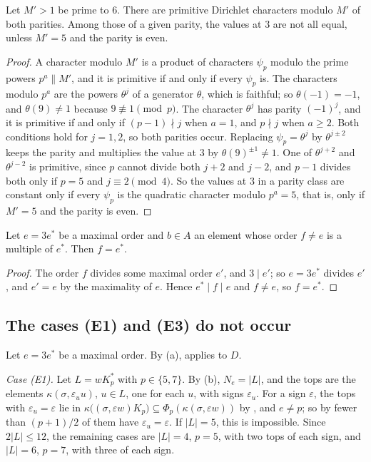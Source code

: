 \begin{lemma}\label{lem:chars}
Let $M'>1$ be prime to $6$. There are primitive Dirichlet characters modulo
$M'$ of both parities. Among those of a given parity, the values at $3$ are
not all equal, unless $M'=5$ and the parity is even.
\end{lemma}

\begin{proof}
A character modulo $M'$ is a product of characters $\psi_{p}$ modulo the
prime powers $p^{a}\parallel M'$, and it is primitive if and only if every
$\psi_{p}$ is. The characters modulo $p^{a}$ are the powers $\theta^{j}$ of a
generator $\theta$, which is faithful; so $\theta(-1)=-1$, and
$\theta(9)\ne1$ because $9\not\equiv1\pmod p$. The character $\theta^{j}$
has parity $(-1)^{j}$, and it is primitive if and only if $(p-1)\nmid j$ when
$a=1$, and $p\nmid j$ when $a\ge2$. Both conditions hold for $j=1,2$, so
both parities occur. Replacing $\psi_{p}=\theta^{j}$ by $\theta^{j\pm2}$
keeps the parity and multiplies the value at $3$ by $\theta(9)^{\pm1}\ne1$.
One of $\theta^{j+2}$ and $\theta^{j-2}$ is primitive, since $p$ cannot
divide both $j+2$ and $j-2$, and $p-1$ divides both only if $p=5$ and
$j\equiv2\pmod4$. So the values at $3$ in a parity class are constant only if
every $\psi_{p}$ is the quadratic character modulo $p^{a}=5$, that is, only
if $M'=5$ and the parity is even.
\end{proof}

\begin{lemma}\label{lem:multiple}
Let $e=3e^{*}$ be a maximal order and $b\in A$ an element whose order
$f\ne e$ is a multiple of $e^{*}$. Then $f=e^{*}$.
\end{lemma}

\begin{proof}
The order $f$ divides some maximal order $e'$, and $3\mid e'$; so $e=3e^{*}$
divides $e'$, and $e'=e$ by the maximality of $e$. Hence $e^{*}\mid f\mid e$
and $f\ne e$, so $f=e^{*}$.
\end{proof}

\subsection{The cases (E1) and (E3) do not occur}
Let $e=3e^{*}$ be a maximal order. By (a), 
applies to $D$.

\emph{Case (E1).} Let $L=wK^{*}_{p}$ with $p\in\{5,7\}$. By
(b), $N_{e}=|L|$, and the tops are the elements
$\kappa(\sigma,\varepsilon_{u}u)$, $u\in L$, one for each $u$, with signs
$\varepsilon_{u}$. For a sign $\varepsilon$, the tops with
$\varepsilon_{u}=\varepsilon$ lie in $\kappa\bigl((\sigma,\varepsilon
w)K_{p}\bigr)\subseteq\Phi_{p}(\kappa(\sigma,\varepsilon w))$ by
, and $e\ne p$; so by  fewer than
$(p+1)/2$ of them have $\varepsilon_{u}=\varepsilon$. If $|L|=5$, this is
impossible. Since $2|L|\le12$, the remaining cases are $|L|=4$, $p=5$, with
two tops of each sign, and $|L|=6$, $p=7$, with three of each sign.

